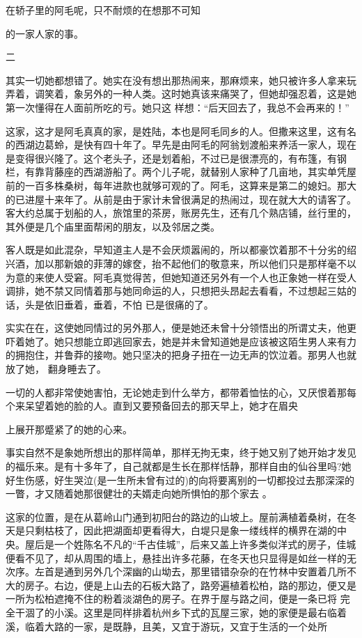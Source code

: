 \documentclass{article}
\begin{document}
在轿子里的阿毛呢，只不耐烦的在想那不可知

\newpage
的一家人家的事。 


二 

其实一切她都想错了。她实在没有想出那热闹来，那麻烦来，她只被许多人拿来玩弄着，调笑着，象另外的一种人类。这时她真该来痛哭了，但她却强忍着，这是她第一次懂得在人面前所吃的亏。她只这
样想：“后天回去了，我总不会再来的！” 

这家，这才是阿毛真真的家，是姓陆，本也是阿毛同乡的人。但撒来这里，这有名的西湖边葛蛉，是快有四十年了。早先是由阿毛的阿翁划渡船来养活一家人，现在是变得很兴隆了。这个老头子，还是划着船，不过已是很漂亮的，有布篷，有钢栏，有靠背藤座的西湖游船了。两个儿子呢，就替别人家种了几亩地，其实单凭屋前的一百多株桑树，每年进款也就够可观的了。阿毛，这算来是第二的媳妇。那大的已进屋十来年了。从前是由于家计未曾很满足的热闹过，现在就大大的请客了。客大约总属于划船的人，旅馆里的茶房，账房先生，还有几个熟店铺，丝行里的，其外便是几个庙里面帮闲的朋友，以及邻居之类。
\newpage

 

客人既是如此混杂，早知道主人是不会厌烦嚣闹的，所以都豪饮着那不十分劣的绍兴酒，加以那新娘的菲薄的嫁奁，抬不起他们的敬意来，所以他们只是那样毫不以为意的来使人受窘。阿毛真觉得苦，但她知道还另外有一个人也正象她一样在受人调排，她不禁又同情着那与她同命运的人，只想把头昂起去看看，不过想起三姑的话，头是依旧垂着，垂着，不怕
已是很痛的了。 

实实在在，这使她同情过的另外那人，便是她还未曾十分领悟出的所谓丈夫，他更吓着她了。她只想能立即逃回家去，她是并未曾知道她是应该被这陌生男人来有力的拥抱住，并鲁莽的接吻。她只坚决的把身子扭在一边无声的饮泣着。那男人也就放了她，
翻身睡去了。 

一切的人都非常使她害怕，无论她走到什么举方，都带着恤怯的心，又厌恨着那每个来呆望着她的脸的人。直到又要预备回去的那天早上，她才在眉央
\newpage

上展开那蹙紧了的她的心来。 

事实自然不是象她所想出的那样简单，那样无拘无束，终于她又别了她开始才发见的福乐来。是有十多年了，自己就都是生长在那样恬静，那样自由的仙谷里吗?她好生伤感，好生哭泣(是一生所未曾有过的)的向将要离别的一切都投过去那深深的一瞥，才又随着她那很健壮的夫婿走向她所惧怕的那个家去
。 

这家的位置，是在从葛岭山门通到初阳台的路边的山坡上。屋前满植着桑树，在冬天是只剩枯枝了，因此把湖面却更看得大，白堤只是象一缕线样的横界在湖的中央。屋后是一个姓陈名不凡的“千古佳城”，后来又盖上许多类似洋式的房子，佳城便看不见了，却从周围的墙上，悬挂出许多花藤，在冬天也只显得是如丝一样的无次序。左首是通到另外几个深幽的山坳去，那里错错杂杂的在竹林中安置着几所不大的房子。右边，便是上山去的石板大路了，路旁遍植着松柏，路的那边，便又是一所为松柏遮掩不住的粉着淡湖色的房子。在界于屋与路之间，便是一条已将
\newpage
完全干涸了的小溪。这里是同样排着杭州乡下式的瓦屋三家，她的家便是最右临着溪，临着大路的一家，是既静，且美，又宜于游玩，又宜于生活的一个处所
\end{document}
